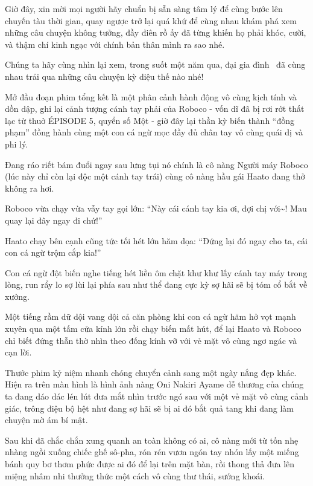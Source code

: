 \documentclass[../main.tex]{subfiles}
\begin{document}
Giờ đây, xin mời mọi người hãy chuẩn bị sẵn sàng tâm lý để cùng bước lên chuyến tàu thời gian, quay ngược trở lại quá khứ để cùng nhau khám phá xem những câu chuyện không tưởng, đầy điên rồ ấy đã từng khiến họ phải khóc, cười, và thậm chí kinh ngạc với chính bản thân mình ra sao nhé.

Chúng ta hãy cùng nhìn lại xem, trong suốt một năm qua, đại gia đình \hll\ đã cùng nhau trải qua những câu chuyện kỳ diệu thế nào nhé!


Mở đầu đoạn phim tổng kết là một phân cảnh hành động vô cùng kịch tính và dồn dập, ghi lại cảnh tượng cánh tay phải của Roboco - vốn dĩ đã bị rơi rớt thất lạc từ thuở {\flaregothic ÉPISODE 5, quyển số Một} - giờ đây lại thần kỳ biến thành ``đồng phạm'' đồng hành cùng một con cá ngừ mọc đầy đủ chân tay vô cùng quái dị và phi lý.

Đang ráo riết bám đuổi ngay sau lưng tụi nó chính là cô nàng Người máy Roboco (lúc này chỉ còn lại độc một cánh tay trái) cùng cô nàng hầu gái Haato đang thở không ra hơi.

Roboco vừa chạy vừa vẫy tay gọi lớn: ``Này cái cánh tay kia ơi, đợi chị với\~{}! Mau quay lại đây ngay đi chứ!''

Haato chạy bên cạnh cũng tức tối hét lớn hăm dọa: ``Đứng lại đó ngay cho ta, cái con cá ngừ trộm cắp kia!''

Con cá ngừ đột biến nghe tiếng hét liền ôm chặt khư khư lấy cánh tay máy trong lòng, run rẩy lo sợ lùi lại phía sau như thể đang cực kỳ sợ hãi sẽ bị tóm cổ bắt về xưởng.

Một tiếng rầm dữ dội vang dội cả căn phòng khi con cá ngừ hăm hở vọt mạnh xuyên qua một tấm cửa kính lớn rồi chạy biến mất hút, để lại Haato và Roboco chỉ biết đứng thẫn thờ nhìn theo đống kính vỡ với vẻ mặt vô cùng ngơ ngác và cạn lời.


\il


Thước phim kỷ niệm nhanh chóng chuyển cảnh sang một ngày nắng đẹp khác. Hiện ra trên màn hình là hình ảnh nàng Oni Nakiri Ayame dễ thương của chúng ta đang dáo dác lén lút đưa mắt nhìn trước ngó sau với một vẻ mặt vô cùng cảnh giác, trông điệu bộ hệt như đang sợ hãi sẽ bị ai đó bắt quả tang khi đang làm chuyện mờ ám bí mật.

Sau khi đã chắc chắn xung quanh an toàn không có ai, cô nàng mới từ tốn nhẹ nhàng ngồi xuống chiếc ghế sô-pha, rón rén vươn ngón tay nhón lấy một miếng bánh quy bơ thơm phức được ai đó để lại trên mặt bàn, rồi thong thả đưa lên miệng nhâm nhi thưởng thức một cách vô cùng thư thái, sướng khoái.
\end{document}
